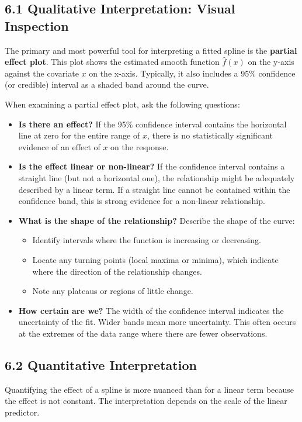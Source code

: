 \documentclass[11pt, a4paper]{article}
\begin{document}
\begin{itemize}
\subsection{6.1 Qualitative Interpretation: Visual Inspection}
The primary and most powerful tool for interpreting a fitted spline is the \textbf{partial effect plot}. This plot shows the estimated smooth function $\hat{f}(x)$ on the y-axis against the covariate $x$ on the x-axis. Typically, it also includes a 95\% confidence (or credible) interval as a shaded band around the curve.

When examining a partial effect plot, ask the following questions:
\begin{itemize}
 \item \textbf{Is there an effect?} If the 95\% confidence interval contains the horizontal line at zero for the entire range of $x$, there is no statistically significant evidence of an effect of $x$ on the response.
 \item \textbf{Is the effect linear or non-linear?} If the confidence interval contains a straight line (but not a horizontal one), the relationship might be adequately described by a linear term. If a straight line cannot be contained within the confidence band, this is strong evidence for a non-linear relationship.
 \item \textbf{What is the shape of the relationship?} Describe the shape of the curve:
  \begin{itemize}
\item Identify intervals where the function is increasing or decreasing.
\item Locate any turning points (local maxima or minima), which indicate where the direction of the relationship changes.
\item Note any plateaus or regions of little change.
  \end{itemize}
 \item \textbf{How certain are we?} The width of the confidence interval indicates the uncertainty of the fit. Wider bands mean more uncertainty. This often occurs at the extremes of the data range where there are fewer observations.
\end{itemize}

\subsection{6.2 Quantitative Interpretation}
Quantifying the effect of a spline is more nuanced than for a linear term because the effect is not constant. The interpretation depends on the scale of the linear predictor.


\end{itemize}
\end{document}
